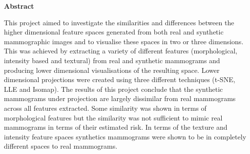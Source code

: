 \thispagestyle{empty}

\begin{center}
    {\LARGE\bf Abstract}
\end{center}

This project aimed to investigate the similarities and differences between the higher dimensional feature spaces generated from both real and synthetic mammographic images and to visualise these spaces in two or three dimensions. This was achieved by extracting a variety of different features (morphological, intensity based and textural) from real and synthetic mammograms and producing lower dimensional visualisations of the resulting space. Lower dimensional projections were created using three different techniques (t-SNE, LLE and Isomap). The results of this project conclude that the synthetic mammograms under projection are largely dissimilar from real mammograms across all features extracted. Some similarity was shown in terms of morphological features but the similarity was not sufficient to mimic real mammograms in terms of their estimated risk. In terms of the texture and intensity feature spaces synthetics mammograms were shown to be in completely different spaces to real mammograms. 
